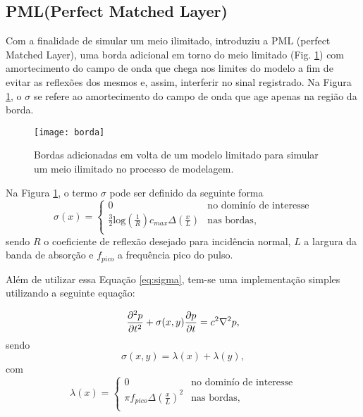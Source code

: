 \subsection{PML(Perfect Matched Layer)}

Com a finalidade de simular um meio ilimitado, \cite{berenger1994perfectly} introduziu a PML
(perfect Matched Layer), uma borda adicional em torno do meio limitado (Fig. \ref{fig:borda}) com amortecimento do campo de onda que chega nos limites
do modelo a fim de evitar as reflexões dos mesmos e, assim, interferir no sinal registrado. Na Figura \ref{fig:borda}, o $\sigma$ se refere ao amortecimento do campo de onda
que age apenas na região da borda.

\begin{figure}[ht!]
	\centering
	\texttt{[image: borda]}
	\caption{Bordas adicionadas em volta de um modelo limitado para simular um meio
		ilimitado no processo de modelagem.}
	\label{fig:borda}
\end{figure}

Na Figura \ref{fig:borda}, o termo $\sigma$ pode ser definido da seguinte forma
\begin{equation}
\sigma(x)=\left\{\begin{matrix} 0 & \text{no dominío de interesse}  \\
\frac{3}{2}\text{log}(\frac{1}{R})c_{max}\Delta(\frac{x}{L}) & \text{nas bordas}, \\
\end{matrix}\right. \label{eq:sigma}
\end{equation}
sendo $R$ o coeficiente de reflexão desejado para incidência normal, $L$ a largura da banda de absorção e $f_{pico}$ a frequência pico do pulso.

Além de utilizar essa Equação \ref{eq:sigma},   tem-se uma implementação simples utilizando a seguinte equação:

\begin{equation}
\dddtt[p]+\sigma(x,y)\ddt[p]=c^2\nabla^2p, \label{eq:simples}
\end{equation}
sendo 
\begin{equation}
\sigma(x,y)=\lambda(x)+\lambda(y),
\end{equation}
com 
\begin{equation}
\lambda(x)=\left\{\begin{matrix} 0 & \text{no dominío de interesse}  \\
\pi f_{pico}\Delta (\frac{x}{L}) ^2& \text{nas bordas}, \\
\end{matrix}\right. \label{eq:lambda}
\end{equation}

